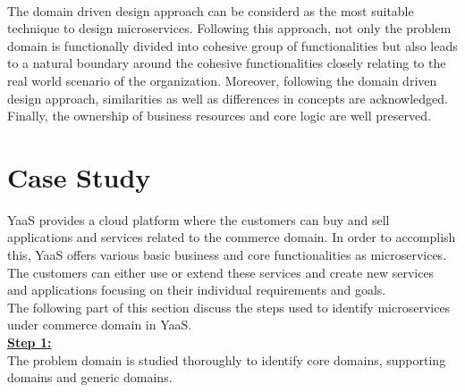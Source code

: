\\
The domain driven design approach can be considerd as the most suitable technique to design microservices. Following this approach, not only the problem domain is functionally divided into cohesive group of functionalities but also leads to a natural boundary around the cohesive functionalities closely relating to the real world scenario of the organization. Moreover, following the domain driven design approach, similarities as well as differences in concepts are acknowledged. Finally, the ownership of business resources and core logic are well preserved.

 \section{Case Study}\label{section:hybris_architecture/example_scenario}
 \acrshort{YaaS} provides a cloud platform where the customers can buy and sell applications and services related to the commerce domain. In order to accomplish this, \acrshort{YaaS} offers various basic business and core functionalities as microservices. The customers can either use or extend these services and create new services and applications focusing on their individual requirements and goals.
 \\
The following part of this section discuss the steps used to identify microservices under commerce domain in \acrshort{YaaS}.
\\
\textbf{\underline{Step 1:}}
\\
The problem domain is studied thoroughly to identify core domains, supporting domains and generic domains.
